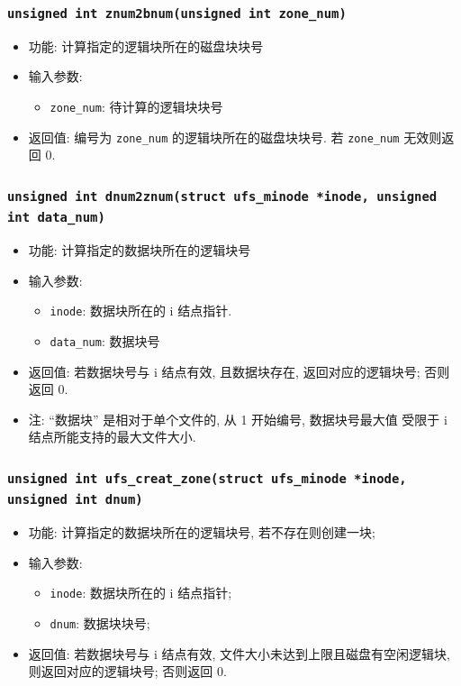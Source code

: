 \documentclass[nofonts]{ctexart}
\begin{document}
  \subsubsection{\texttt{unsigned int znum2bnum(unsigned int zone\_num)}}
  \begin{itemize}
\item
  功能: 计算指定的逻辑块所在的磁盘块块号
\item
  输入参数:

  \begin{itemize}
  \item
    \texttt{zone\_num}: 待计算的逻辑块块号
  \end{itemize}
\item
  返回值: 编号为 \texttt{zone\_num} 的逻辑块所在的磁盘块块号. 若
  \texttt{zone\_num} 无效则返回 0.
  \end{itemize}
  \subsubsection{\texttt{unsigned int dnum2znum(struct ufs\_minode *inode, unsigned int data\_num)}}
\begin{itemize}
\item
  功能: 计算指定的数据块所在的逻辑块号
\item
  输入参数:

  \begin{itemize}
  \item
    \texttt{inode}: 数据块所在的 i 结点指针.
  \item
    \texttt{data\_num}: 数据块号
  \end{itemize}
\item
  返回值: 若数据块号与 i 结点有效, 且数据块存在, 返回对应的逻辑块号;
  否则返回 0.
\item
  注: ``数据块'' 是相对于单个文件的, 从 1 开始编号, 数据块号最大值
  受限于 i 结点所能支持的最大文件大小.
  \end{itemize}
  \subsubsection{\texttt{unsigned int ufs\_creat\_zone(struct ufs\_minode *inode, unsigned int dnum)}}
  \begin{itemize}
\item
  功能: 计算指定的数据块所在的逻辑块号, 若不存在则创建一块;
\item
  输入参数:

  \begin{itemize}
  \item
    \texttt{inode}: 数据块所在的 i 结点指针;
  \item
    \texttt{dnum}: 数据块块号;
  \end{itemize}
\item
  返回值: 若数据块号与 i 结点有效, 文件大小未达到上限且磁盘有空闲逻辑块,
  则返回对应的逻辑块号; 否则返回 0.
  \end{itemize}
\end{document}
